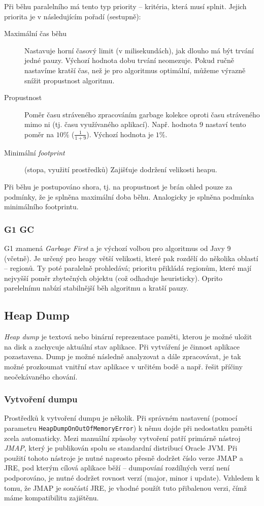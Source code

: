 Při běhu paralelního  má tento typ priority -- kritéria, která musí splnit. Jejich priorita je v následujícím pořadí (sestupně):
\begin{description}
    \item[Maximální čas běhu] Nastavuje horní časový limit (v milisekundách), jak dlouho má být trvání jedné pauzy. Výchozí hodnota dobu trvání neomezuje. Pokud ručně nastavíme kratší čas, než je pro algoritmus optimální, můžeme výrazně snížit propustnost algoritmu.
    \item[Propustnost] Poměr času stráveného zpracováním garbage kolekce oproti času stráveného mimo ni (tj. času využívaného aplikací). Např. hodnota $9$ nastaví tento poměr na $10 \%$ ($\frac{1}{1+9}$). Výchozí hodnota je $1 \%$.
    \item[Minimální \textit{footprint}] (stopa, využití prostředků) Zajišťuje dodržení velikosti heapu.
\end{description}

Při běhu  je postupováno shora, tj. na propustnost je brán ohled pouze za podmínky, že je splněna maximální doba běhu. Analogicky je splněna podmínka minimálního footprintu.

\subsubsection{G1 GC}
G1 znamená \textit{Garbage First} a je výchozí volbou pro algoritmus od Javy 9 (včetně). Je určený pro heapy větší velikosti, které pak rozdělí do několika oblastí -- regionů. Ty poté paralelně prohledává; prioritu přikládá regionům, které mají nejvyšší poměr zbytečných objektu (což odhaduje heuristicky). Oprito parelelnímu  nabízí stabilnější běh algoritmu a kratší pauzy.


\subsection{Heap Dump}
\textit{Heap dump} je textová nebo binární reprezentace paměti, kterou je možné uložit na disk a zachycuje aktuální stav aplikace. Při vytváření je činnost aplikace pozastavena. Dump je možné následně analyzovat a dále zpracovávat, je tak možné prozkoumat vnitřní stav aplikace v určitém bodě a např. řešit příčiny neočekávaného chování. 

\subsubsection{Vytvoření dumpu}
Prostředků k vytvoření dumpu je několik. Při správném nastavení (pomocí parametru \texttt{HeapDumpOnOutOfMemoryError}) k němu dojde při nedostatku paměti zcela automaticky. Mezi manuální způsoby vytvoření patří primárně nástroj \textit{JMAP}, který je publikován spolu se standardní distribucí Oracle JVM. Při použití tohoto nástroje je nutné naprosto přesně dodržet číslo verze JMAP a JRE, pod kterým cílová aplikace běží – dumpování rozdílných verzí není podporováno, je nutné dodržet rovnost verzí (major, minor i update). Vzhledem k tomu, že JMAP je součástí JRE, je vhodné použít tuto přibalenou verzi, čímž máme kompatibilitu zajištěnu.

